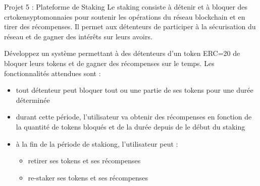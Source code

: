 \begin{frame}{Projet 5 : Plateforme de Staking}
  Le staking consiste à détenir et à bloquer des crtokensyptomonnaies pour soutenir les opérations du réseau blockchain et en tirer des récompenses.
  Il permet aux détenteurs de participer à la sécurisation du réseau et de gagner des intérêts sur leurs avoirs.

  Développez un système permettant à des détenteurs d'un token ERC=20 de bloquer leurs tokens et de gagner des récompenses sur le temps.
  Les fonctionnalités attendues sont :

  \begin{itemize}
    \item tout détenteur peut bloquer tout ou une partie de ses tokens pour une durée déterminée
    \item durant cette période, l'utilisateur va obtenir des récompenses en fonction de la quantité de tokens bloqués et de la durée depuis de le début du staking
    \item à la fin de la période de stakiong, l'utilisateur peut :
          \begin{itemize}
            \item retirer ses tokens et ses récompenses
            \item re-staker ses tokens et ses récompenses
          \end{itemize}
  \end{itemize}
\end{frame}